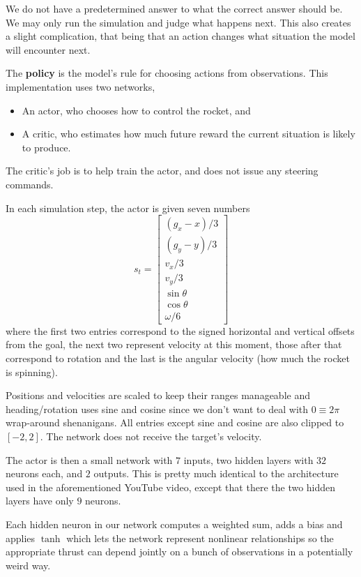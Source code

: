 \documentclass[12pt, letterpaper]{article}
\begin{document}
We do not have a predetermined answer to what the 
correct answer should be. We may only 
run the simulation and judge what happens next. 
This also creates a slight complication, that 
being that an action changes what 
situation the model will encounter next. 

The \textbf{policy} is the model's rule for 
choosing actions from observations. 
This implementation uses two networks, 
\begin{itemize}
    \item An actor, who chooses how to control the rocket, and 
    \item A critic, who estimates how much future reward 
        the current situation is likely to produce. 
\end{itemize}

The critic's job is to help train the actor, and 
does not issue any steering commands. 

In each simulation step, 
the actor is given seven numbers 
\[
    s_t = 
    \begin{bmatrix}
        (g_x - x)/ 3 \\ 
        (g_y - y)/ 3 \\ 
        v_x/3 \\ 
        v_y/3 \\ 
        \sin \theta \\ 
        \cos \theta \\ 
        \omega/6 
    \end{bmatrix}
\]
where the first two entries correspond to 
the signed horizontal and vertical offsets from the goal, the next two 
represent velocity at this moment, those after 
that correspond to rotation and the last 
is the angular velocity (how much the rocket is spinning). 

Positions and velocities are scaled 
to keep their ranges manageable and heading/rotation 
uses sine and cosine since we 
don't want to deal with $0 \equiv 2\pi$ wrap-around 
shenanigans. 
All entries except sine and cosine are also clipped to $[-2,2]$.
The network does not receive the target's velocity.

The actor is then a small network with $7$ inputs, 
two hidden layers with $32$ neurons each, and 
$2$ outputs. This is pretty much identical to the 
architecture used in the aforementioned YouTube 
video, except that there the two hidden layers 
have only $9$ neurons.

Each hidden neuron in our network computes a 
weighted sum, adds a bias and applies $\tanh$ which 
lets the network represent nonlinear relationships so
the appropriate thrust can depend jointly 
on a bunch of observations in a 
potentially weird way. 
\end{document}
